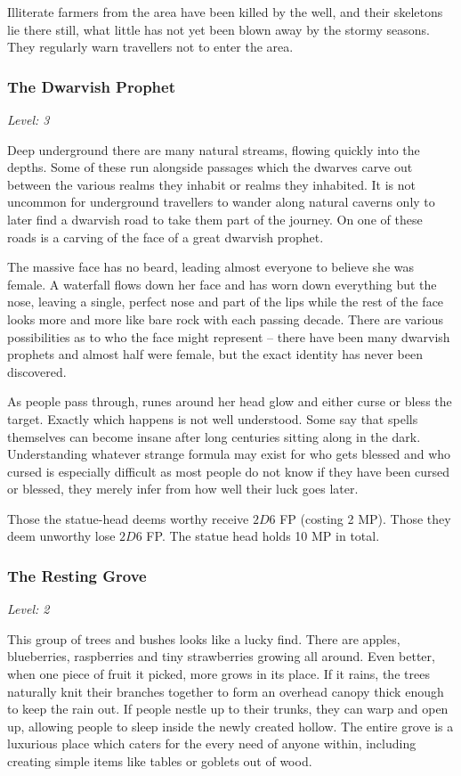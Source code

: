 \begin{multicols}{2}
Illiterate farmers from the area have been killed by the well, and their skeletons lie there still, what little has not yet been blown away by the stormy seasons.  They regularly warn travellers not to enter the area.

\subsubsection{The Dwarvish Prophet}

\textit{Level: 3}

Deep underground there are many natural streams, flowing quickly into the depths.  Some of these run alongside passages which the dwarves carve out between the various realms they inhabit or realms they inhabited.  It is not uncommon for underground travellers to wander along natural caverns only to later find a dwarvish road to take them part of the journey.  On one of these roads is a carving of the face of a great dwarvish prophet.

The massive face has no beard, leading almost everyone to believe she was female.  A waterfall flows down her face and has worn down everything but the nose, leaving a single, perfect nose and part of the lips while the rest of the face looks more and more like bare rock with each passing decade.  There are various possibilities as to who the face might represent -- there have been many dwarvish prophets and almost half were female, but the exact identity has never been discovered.

As people pass through, runes around her head glow and either curse or bless the target.  Exactly which happens is not well understood.  Some say that spells themselves can become insane after long centuries sitting along in the dark.  Understanding whatever strange formula may exist for who gets blessed and who cursed is especially difficult as most people do not know if they have been cursed or blessed, they merely infer from how well their luck goes later.

Those the statue-head deems worthy receive $2D6$ FP (costing 2 MP).  Those they deem unworthy lose $2D6$ FP.  The statue head holds 10 MP in total.

\subsubsection{The Resting Grove}

\textit{Level: 2}

This group of trees and bushes looks like a lucky find.  There are apples, blueberries, raspberries and tiny strawberries growing all around.  Even better, when one piece of fruit it picked, more grows in its place.  If it rains, the trees naturally knit their branches together  to form an overhead canopy thick enough to keep the rain out.  If people nestle up to their trunks, they can warp and open up, allowing people to sleep inside the newly created hollow.  The entire grove is a luxurious place which caters for the every need of anyone within, including creating simple items like tables or goblets out of wood.


\end{multicols}
